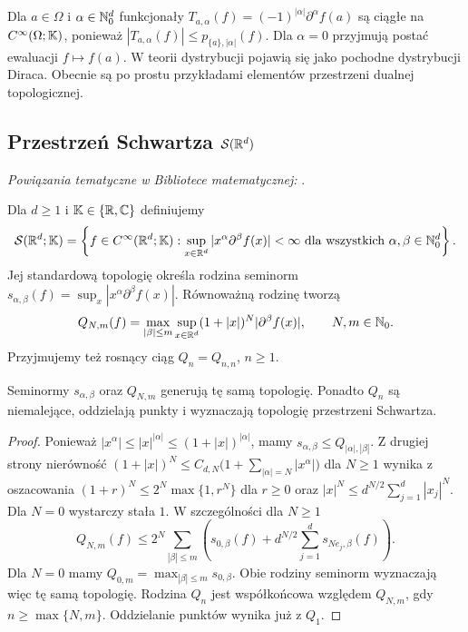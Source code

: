 \begin{przyklad}
\label{ex:evaluation-cinf17}
Dla $a\in\Omega$ i $\alpha\in\mathbb N_0^d$ funkcjonały
$T_{a,\alpha}(f)=(-1)^{|\alpha|}\partial^\alpha f(a)$
są ciągłe na $C^\infty(\Omega;\mathbb K)$, ponieważ
$|T_{a,\alpha}(f)|\le p_{\{a\},|\alpha|}(f)$.
Dla $\alpha=0$
przyjmują postać ewaluacji $f\mapsto f(a)$.
W teorii dystrybucji pojawią się jako pochodne
dystrybucji Diraca. Obecnie są po prostu przykładami
elementów przestrzeni dualnej topologicznej.
\end{przyklad}

\subsection{Przestrzeń Schwartza \texorpdfstring{$\mathcal S(\mathbb R^d)$}{S(Rd)}}

\noindent\emph{Powiązania tematyczne w Bibliotece matematycznej:} .


\begin{definicja}
\label{def:schwartz17}
Dla $d\ge1$ i $\mathbb K\in\{\mathbb R,\mathbb C\}$ definiujemy
\[
\mathcal S(\mathbb R^d;\mathbb K)=\left\{f\in C^\infty(\mathbb R^d;\mathbb K):
\sup_{x\in\mathbb R^d}|x^\alpha\partial^\beta f(x)|<\infty
\ \text{dla wszystkich }\alpha,\beta\in\mathbb N_0^d\right\}.
\]
Jej standardową topologię określa rodzina seminorm
$s_{\alpha,\beta}(f)=\sup_x|x^\alpha\partial^\beta f(x)|$.
Równoważną rodzinę tworzą
\[
 Q_{N,m}(f)=\max_{|\beta|\le m}\sup_{x\in\mathbb R^d}
 (1+|x|)^N|\partial^\beta f(x)|,
 \qquad N,m\in\mathbb N_0.
\]
Przyjmujemy też rosnący ciąg $Q_n=Q_{n,n}$, $n\ge1$.
\end{definicja}

\begin{lemat}
\label{lem:schwartz-seminorms17}
Seminormy $s_{\alpha,\beta}$ oraz $Q_{N,m}$ generują tę samą
topologię. Ponadto $Q_n$ są niemalejące, oddzielają punkty
i wyznaczają topologię przestrzeni Schwartza.
\end{lemat}
\begin{proof}
Ponieważ $|x^\alpha|\le |x|^{|\alpha|}\le(1+|x|)^{|\alpha|}$,
mamy $s_{\alpha,\beta}\le Q_{|\alpha|,|\beta|}$.
Z drugiej strony nierówność
$(1+|x|)^N\le C_{d,N}\bigl(1+\sum_{|\alpha|=N}|x^\alpha|\bigr)$
dla $N\ge1$ wynika z oszacowania
$(1+r)^N\le 2^N\max\{1,r^N\}$ dla $r\ge0$ oraz
$|x|^N\le d^{N/2}\sum_{j=1}^d|x_j|^N$.
Dla $N=0$ wystarczy stała $1$. W szczególności dla $N\ge1$
\[
Q_{N,m}(f)\le 2^N\sum_{|\beta|\le m}
\left(s_{0,\beta}(f)+d^{N/2}\sum_{j=1}^d s_{Ne_j,\beta}(f)\right).
\]
Dla $N=0$ mamy $Q_{0,m}=\max_{|\beta|\le m}s_{0,\beta}$.
Obie rodziny seminorm wyznaczają więc tę samą topologię.
Rodzina $Q_n$ jest współkońcowa względem $Q_{N,m}$,
gdy $n\ge\max\{N,m\}$. Oddzielanie punktów wynika już z $Q_1$.
\end{proof}

